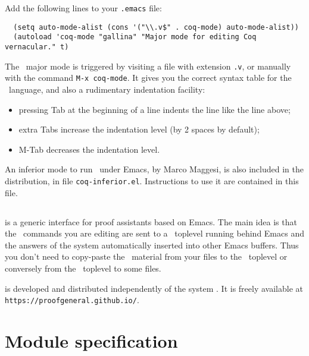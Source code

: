 Add the following lines to your \verb!.emacs! file:

\begin{verbatim}
  (setq auto-mode-alist (cons '("\\.v$" . coq-mode) auto-mode-alist))
  (autoload 'coq-mode "gallina" "Major mode for editing Coq vernacular." t)
\end{verbatim}

The \Coq\ major mode is triggered by visiting a file with extension {\tt .v},
or manually with the command \verb!M-x coq-mode!.
It gives you the correct syntax table for
the \Coq\ language, and also a rudimentary indentation facility:
\begin{itemize}
  \item pressing {\sc Tab} at the beginning of a line indents the line like
    the line above;

  \item extra {\sc Tab}s increase the indentation level
    (by 2 spaces by default);

  \item M-{\sc Tab} decreases the indentation level.
\end{itemize}

An inferior mode to run \Coq\ under Emacs, by Marco Maggesi, is also
included in the distribution, in file \texttt{coq-inferior.el}.
Instructions to use it are contained in this file.

\subsection[{\ProofGeneral}]{{\ProofGeneral}}

{\ProofGeneral} is a generic interface for proof assistants based on
Emacs. The main idea is that the \Coq\ commands you are
editing are sent to a \Coq\ toplevel running behind Emacs and the
answers of the system automatically inserted into other Emacs buffers.
Thus you don't need to copy-paste the \Coq\ material from your files
to the \Coq\ toplevel or conversely from the \Coq\ toplevel to some
files.

{\ProofGeneral} is developed and distributed independently of the
system \Coq. It is freely available at \verb!https://proofgeneral.github.io/!.


\section[Module specification]{Module specification\label{gallina}}

